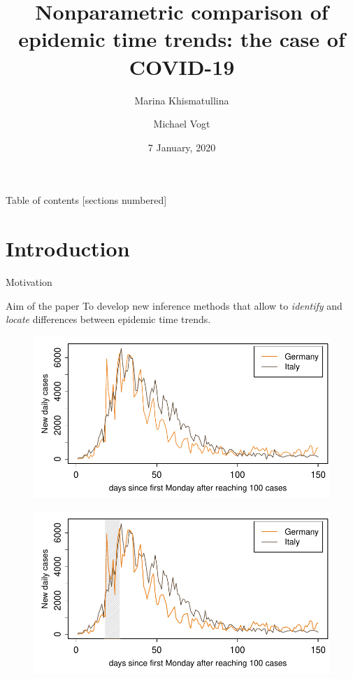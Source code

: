 \documentclass[10pt]{beamer}
\title{Nonparametric comparison of epidemic time trends: the case of COVID-19}
\date{7 January, 2020}
\author{Marina Khismatullina \and Michael Vogt}
\begin{document}
\maketitle

\begin{frame}{Table of contents}
  [sections numbered]
  \tableofcontents[hideallsubsections]
\end{frame}

\section{Introduction}


\begin{frame}{Motivation}

{ \begin{block}{Aim of the paper}
	To develop new inference methods that allow to \textit{identify} and \textit{locate} differences between epidemic time trends.
\end{block}}
	{\begin{figure}
    		\centering
    		\includegraphics[height=0.45\textheight]{plots/Germany_and_Italy.pdf}
  	\end{figure}}
	{\onslide<3>
	\vspace{-46,81mm}
	\begin{figure}
    		\centering
    		\includegraphics[height=0.45\textheight]{plots/Germany_and_Italy_1.pdf}

\end{figure}}
\end{frame}
\end{document}
